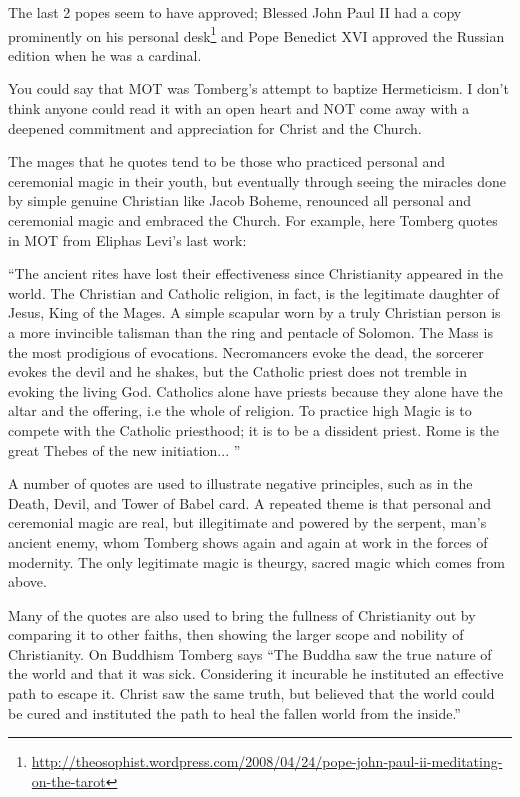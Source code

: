 \begin{footnotesize}
\begin{sffamily}
The last 2 popes seem to have approved; Blessed John Paul II had a copy prominently on his personal desk\footnote{\url{http://theosophist.wordpress.com/2008/04/24/pope-john-paul-ii-meditating-on-the-tarot}} and Pope Benedict XVI approved the Russian edition when he was a cardinal.

You could say that MOT was Tomberg's attempt to baptize Hermeticism. I don't think anyone could read it with an open heart and NOT come away with a deepened commitment and appreciation for Christ and the Church.

The mages that he quotes tend to be those who practiced personal and ceremonial magic in their youth, but eventually through seeing the miracles done by simple genuine Christian like Jacob Boheme, renounced all personal and ceremonial magic and embraced the Church. For example, here Tomberg quotes in MOT from Eliphas Levi's last work:

``The ancient rites have lost their effectiveness since Christianity appeared in the world. The Christian and Catholic religion, in fact, is the legitimate daughter of Jesus, King of the Mages. A simple scapular worn by a truly Christian person is a more invincible talisman than the ring and pentacle of Solomon. The Mass is the most prodigious of evocations. Necromancers evoke the dead, the sorcerer evokes the devil and he shakes, but the Catholic priest does not tremble in evoking the living God. Catholics alone have priests because they alone have the altar and the offering, i.e the whole of religion. To practice high Magic is to compete with the Catholic priesthood; it is to be a dissident priest. Rome is the great Thebes of the new initiation... ''

A number of quotes are used to illustrate negative principles, such as in the Death, Devil, and Tower of Babel card. A repeated theme is that personal and ceremonial magic are real, but illegitimate and powered by the serpent, man's ancient enemy, whom Tomberg shows again and again at work in the forces of modernity. The only legitimate magic is theurgy, sacred magic which comes from above.

Many of the quotes are also used to bring the fullness of Christianity out by comparing it to other faiths, then showing the larger scope and nobility of Christianity. On Buddhism Tomberg says ``The Buddha saw the true nature of the world and that it was sick. Considering it incurable he instituted an effective path to escape it. Christ saw the same truth, but believed that the world could be cured and instituted the path to heal the fallen world from the inside.''


\end{sffamily}
\end{footnotesize}
